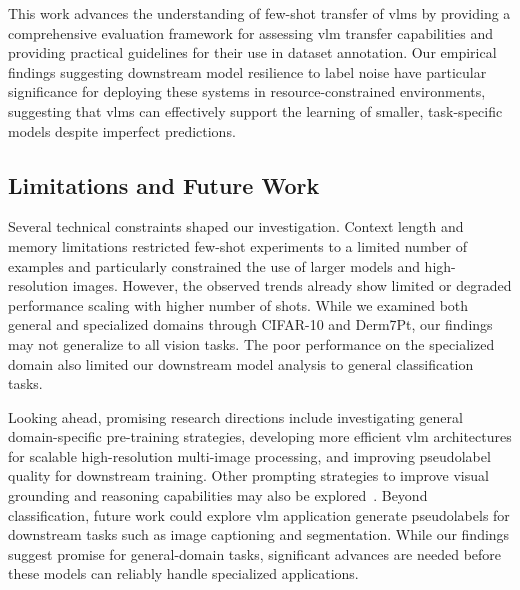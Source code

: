 \documentclass[../ShajiS_RnDReport.tex]{subfiles}
\begin{document}
    This work advances the understanding of few-shot transfer of \glspl{vlm} by providing a comprehensive evaluation framework for assessing \gls{vlm} transfer capabilities and providing practical guidelines for their use in dataset annotation. Our empirical findings suggesting downstream model resilience to label noise have particular significance for deploying these systems in resource-constrained environments, suggesting that \glspl{vlm} can effectively support the learning of smaller, task-specific models despite imperfect predictions.

    \subsection{Limitations and Future Work}
    \label{sec:conclusions:limitations}
    
    Several technical constraints shaped our investigation. Context length and memory limitations restricted few-shot experiments to a limited number of examples and particularly constrained the use of larger models and high-resolution images. However, the observed trends already show limited or degraded performance scaling with higher number of shots. While we examined both general and specialized domains through CIFAR-10 and Derm7Pt, our findings may not generalize to all vision tasks. The poor performance on the specialized domain also limited our downstream model analysis to general classification tasks.

    Looking ahead, promising research directions include investigating general domain-specific pre-training strategies, developing more efficient \gls{vlm} architectures for scalable high-resolution multi-image processing, and improving pseudolabel quality for downstream training. Other prompting strategies to improve visual grounding and reasoning capabilities may also be explored~\cite{Yang2023a}. Beyond classification, future work could explore \gls{vlm} application generate pseudolabels for downstream tasks such as image captioning and segmentation. While our findings suggest promise for general-domain tasks, significant advances are needed before these models can reliably handle specialized applications.
\end{document}
